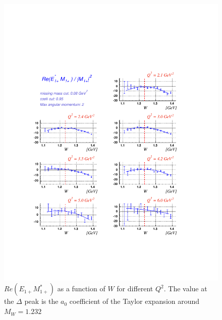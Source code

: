 \begin{figure}[h]
 \begin{center}
 \includegraphics[width = 13cm, bb=30 130 550 600]{analysis/img/multiem_taylor} 
  \caption[ $Re(E_{1+}M_{1+}^*)$ as a function of $W$ for different $Q^2$.]
{ $Re(E_{1+}M_{1+}^*)$ as a function of $W$ for different $Q^2$. The value at the $\Delta $ peak
is the $a_0$ coefficient of the Taylor expansion around $M_W = 1.232$}
 \label{fig:multiem_taylor}
 \end{center}
\end{figure}
